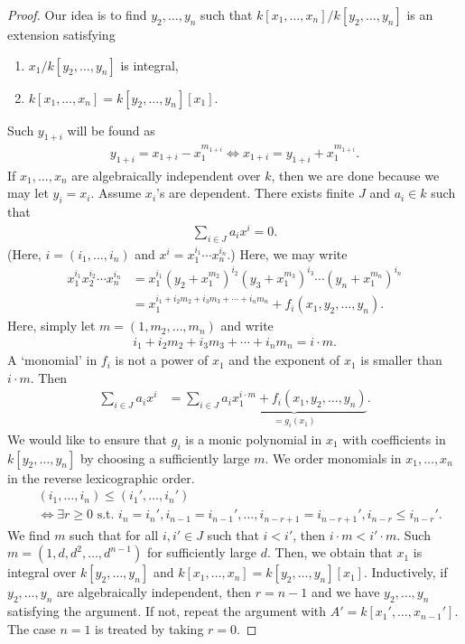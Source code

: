 \documentclass[12pt]{report}
\theoremstyle{plain}
\theoremstyle{remark}
\theoremstyle{definition}
\begin{document}
\begin{proof}
    Our idea is to find $y_2,\dots,y_n$ such that $k[x_1,\dots,x_n]/k[y_2,\dots,y_n]$ is an extension satisfying
    \begin{enumerate}
        \item $x_1/k[y_2,\dots,y_n]$ is integral,
        \item $k[x_1,\dots,x_n]=k[y_2,\dots,y_n][x_1]$.
    \end{enumerate}
    Such $y_{1+i}$ will be found as
    \begin{align*}
        y_{1+i}=x_{1+i}-x_1^{m_{1+i}} \iff x_{1+i}=y_{1+i}+x_1^{m_{1+i}}.
    \end{align*}
    If $x_1,\dots,x_n$ are algebraically independent over $k$, then we are done because we may let $y_i=x_i$. Assume $x_i$'s are dependent. There exists finite $J$ and $a_i\in k$ such that
    \begin{align*}
        \sum_{i\in J}a_ix^i=0.
    \end{align*}
    (Here, $i=(i_1,\dots,i_n)$ and $x^i=x_1^{i_1}\cdots x_n^{i_n}$.) Here, we may write
    \begin{align*}
        x_1^{i_1}x_2^{i_2}\cdots x_n^{i_n} &= x_1^{i_1}(y_2+x_1^{m_2})^{i_2}(y_3+x_1^{m_3})^{i_3}\cdots (y_n+x_1^{m_n})^{i_n} \\
        &= x_1^{i_1+i_2m_2+i_3m_3+\cdots+i_nm_n}+f_i(x_1,y_2,\dots,y_n).
    \end{align*}
    Here, simply let $m=(1,m_2,\dots,m_n)$ and write
    \begin{align*}
        i_1+i_2m_2+i_3m_3+\cdots+i_nm_n = i\cdot m.
    \end{align*}
    A `monomial' in $f_i$ is not a power of $x_1$ and the exponent of $x_1$ is smaller than $i\cdot m$. Then
    \begin{align*}
        \sum_{i\in J}a_ix^i &= \sum_{i\in J} \underbrace{a_ix_1^{i\cdot m}+f_i(x_1,y_2,\dots,y_n)}_{=g_i(x_1)}.
    \end{align*}
    We would like to ensure that $g_i$ is a monic polynomial in $x_1$ with coefficients in $k[y_2,\dots,y_n]$ by choosing a sufficiently large $m$. We order monomials in $x_1,\dots,x_n$ in the reverse lexicographic order.
    \begin{align*}
        &(i_1,\dots,i_n)\le (i_1',\dots,i_n') \\
        &\iff \exists r\ge 0\text{ s.t. } i_n=i_n',i_{n-1}=i_{n-1}',\dots,i_{n-r+1}=i_{n-r+1}',i_{n-r}\le i_{n-r}'.
    \end{align*}
    We find $m$ such that for all $i,i'\in J$ such that $i<i'$, then $i\cdot m<i'\cdot m$. Such $m=(1,d,d^2,\dots,d^{n-1})$ for sufficiently large $d$. Then, we obtain that $x_1$ is integral over $k[y_2,\dots,y_n]$ and $k[x_1,\dots,x_n]=k[y_2,\dots,y_n][x_1]$. Inductively, if $y_2,\dots,y_n$ are algebraically independent, then $r=n-1$ and we have $y_2,\dots,y_n$ satisfying the argument. If not, repeat the argument with $A'=k[x_1',\dots,x_{n-1}']$. The case $n=1$ is treated by taking $r=0$.
\end{proof}
\end{document}
